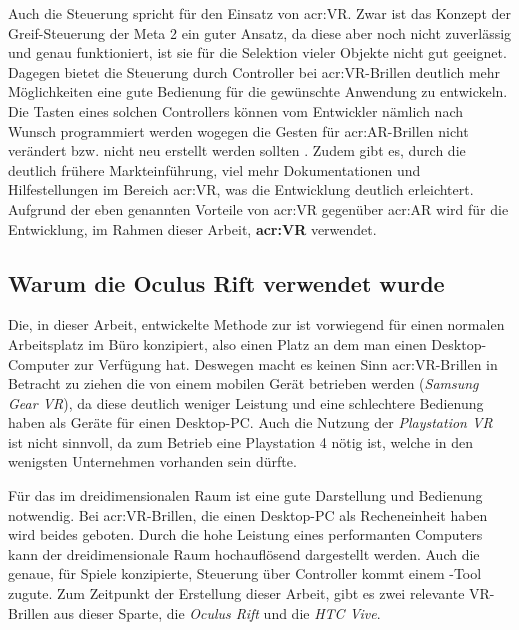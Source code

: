 Auch die Steuerung spricht für den Einsatz von \acrlong{acr:VR}. Zwar ist das Konzept der Greif-Steuerung der Meta 2 ein guter Ansatz, da diese aber noch nicht zuverlässig und genau funktioniert, ist sie für die Selektion vieler Objekte nicht gut geeignet. Dagegen bietet die Steuerung durch Controller bei \acrshort{acr:VR}-Brillen deutlich mehr Möglichkeiten eine gute Bedienung für die gewünschte Anwendung zu entwickeln. Die Tasten eines solchen Controllers können vom Entwickler nämlich nach Wunsch programmiert werden wogegen die Gesten für \acrshort{acr:AR}-Brillen nicht verändert bzw. nicht neu erstellt werden sollten \cite{bib:NewGesture}. Zudem gibt es, durch die deutlich frühere Markteinführung, viel mehr Dokumentationen und Hilfestellungen im Bereich \acrlong{acr:VR}, was die Entwicklung deutlich erleichtert.
Aufgrund der eben genannten Vorteile von \acrshort{acr:VR} gegenüber \acrshort{acr:AR} wird für die Entwicklung, im Rahmen dieser Arbeit, \textbf{\acrlong{acr:VR}} verwendet.\\

\subsection{Warum die Oculus Rift verwendet wurde}
\label{WhyOculus}

Die, in dieser Arbeit, entwickelte Methode zur  ist vorwiegend für einen normalen Arbeitsplatz im Büro konzipiert, also einen Platz an dem man einen Desktop-Computer zur Verfügung hat. Deswegen macht es keinen Sinn \acrshort{acr:VR}-Brillen in Betracht zu ziehen die von einem mobilen Gerät betrieben werden (\textit{Samsung Gear VR}), da diese deutlich weniger Leistung und eine schlechtere Bedienung haben als Geräte für einen Desktop-PC. Auch die Nutzung der \textit{Playstation VR} ist nicht sinnvoll, da zum Betrieb eine Playstation 4 nötig ist, welche in den wenigsten Unternehmen vorhanden sein dürfte.

Für das  im dreidimensionalen Raum ist eine gute Darstellung und Bedienung notwendig. Bei \acrshort{acr:VR}-Brillen, die einen Desktop-PC als Recheneinheit haben wird beides geboten. Durch die hohe Leistung eines performanten Computers kann der dreidimensionale Raum hochauflösend dargestellt werden. Auch die genaue, für Spiele konzipierte, Steuerung über Controller kommt einem -Tool zugute. Zum Zeitpunkt der Erstellung dieser Arbeit, gibt es zwei relevante VR-Brillen aus dieser Sparte, die \textit{Oculus Rift} und die \textit{HTC Vive}.

